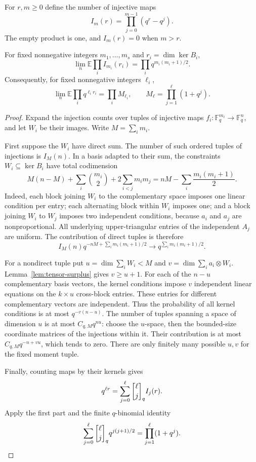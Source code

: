For $r,m\ge0$ define the number of injective maps
\[
 I_m(r)=\prod_{j=0}^{m-1}(q^r-q^j).
\]
The empty product is one, and $I_m(r)=0$ when $m>r$.

\begin{lemma}
\label{lem:mixed-injection-moments}
For fixed nonnegative integers $m_1,\ldots,m_s$ and $r_i=\dim\ker B_i$,
\[
 \lim_n\mathbb E\prod_i I_{m_i}(r_i)
   =\prod_i q^{m_i(m_i+1)/2}.
\]
Consequently, for fixed nonnegative integers $\ell_i$,
\[
 \lim_n\mathbb E\prod_i q^{\ell_i r_i}
 =\prod_i M_{\ell_i},\qquad
 M_\ell=\prod_{j=1}^{\ell}(1+q^j).
\]
\end{lemma}

\begin{proof}
Expand the injection counts over tuples of injective maps
$f_i:\mathbb F_q^{m_i}\to\mathbb F_q^n$, and let $W_i$ be their images.
Write $M=\sum_i m_i$.

First suppose the $W_i$ have direct sum. The number of such ordered tuples
of injections is $I_M(n)$. In a basis adapted to their sum, the constraints
$W_i\subseteq\ker B_i$ have total codimension
\[
 M(n-M)+\sum_i\binom{m_i}{2}+2\sum_{i<j}m_im_j
 =nM-\sum_i\frac{m_i(m_i+1)}2.
\]
Indeed, each block joining $W_i$ to the complementary space imposes one
linear condition per entry; each alternating block within $W_i$ imposes
one; and a block joining $W_i$ to $W_j$ imposes two independent conditions,
because $a_i$ and $a_j$ are nonproportional. All underlying upper-triangular
entries of the independent $A_j$ are uniform. The contribution of direct
tuples is therefore
\[
 I_M(n)q^{-nM+\sum_i m_i(m_i+1)/2}
 \longrightarrow q^{\sum_i m_i(m_i+1)/2}.
\]

For a nondirect tuple put $u=\dim\sum_iW_i<M$ and
$v=\dim\sum_i a_i\otimes W_i$. Lemma~\ref{lem:tensor-surplus} gives
$v\ge u+1$. For each of the $n-u$ complementary basis vectors, the
kernel conditions impose $v$ independent linear equations on the
$k\times u$ cross-block entries. These entries for different complementary
vectors are independent. Thus the probability of all kernel conditions
is at most $q^{-v(n-u)}$. The number of tuples spanning a space of dimension
$u$ is at most $C_{q,M}q^{nu}$: choose the $u$-space, then the bounded-size
coordinate matrices of the injections within it. Their contribution is
at most $C_{q,M}q^{-n+v u}$, which tends to zero. There are only finitely many
possible $u,v$ for the fixed moment tuple.

Finally, counting maps by their kernels gives
\[
 q^{\ell r}=\sum_{j=0}^{\ell}\qbinom{\ell}{j} I_j(r).
\]
Apply the first part and the finite $q$-binomial identity
\[
 \sum_{j=0}^{\ell}\qbinom{\ell}{j} q^{j(j+1)/2}
 =\prod_{j=1}^{\ell}(1+q^j).
\]
\end{proof}

